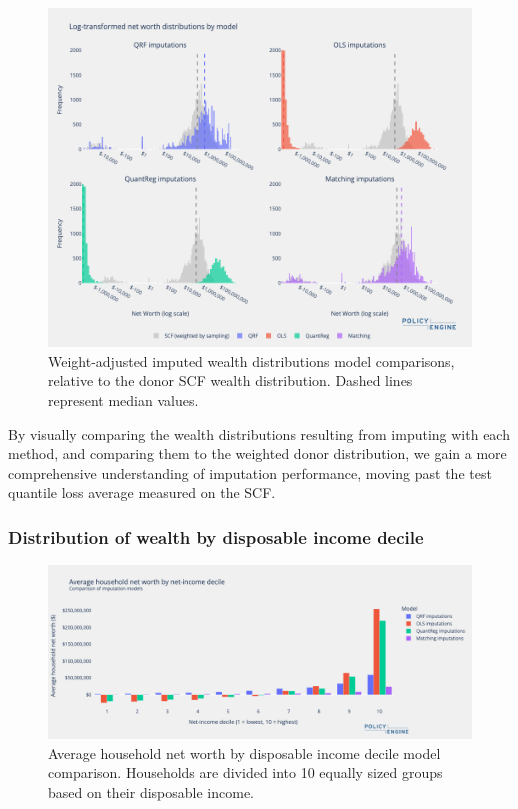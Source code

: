 \begin{figure}[h]
    \centering
    \includegraphics[width=\textwidth]{figures/imputation_distributions_method_comparison.png}
    \caption{Weight-adjusted imputed wealth distributions model comparisons, relative to the donor SCF wealth distribution. Dashed lines represent median values.}
    \label{fig:imputation_distributions_method_comparison}
\end{figure}

By visually comparing the wealth distributions resulting from imputing with each method, and comparing them to the weighted donor distribution, we gain a more comprehensive understanding of imputation performance, moving past the test quantile loss average measured on the SCF. 

\subsubsection{Distribution of wealth by disposable income decile}

\begin{figure}[h]
    \centering
    \includegraphics[width=\textwidth]{figures/imputation_comparison_by_income_decile.png}
    \caption{Average household net worth by disposable income decile model comparison. Households are divided into 10 equally sized groups based on their disposable income.}
    \label{fig:imputation_comparison_by_income_decile}
\end{figure}

